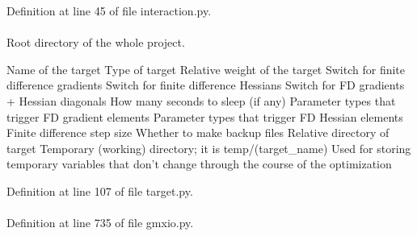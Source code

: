\-Definition at line 45 of file interaction.\-py.

\hypertarget{classforcebalance_1_1target_1_1Target_aede2856573b890cd47054ad36937d6f6}{
\paragraph[{tempdir}]{}}\label{classforcebalance_1_1target_1_1Target_aede2856573b890cd47054ad36937d6f6}


\-Root directory of the whole project. 

\-Name of the target \-Type of target \-Relative weight of the target \-Switch for finite difference gradients \-Switch for finite difference \-Hessians \-Switch for \-F\-D gradients + \-Hessian diagonals \-How many seconds to sleep (if any) \-Parameter types that trigger \-F\-D gradient elements \-Parameter types that trigger \-F\-D \-Hessian elements \-Finite difference step size \-Whether to make backup files \-Relative directory of target \-Temporary (working) directory; it is temp/(target\-\_\-name) \-Used for storing temporary variables that don't change through the course of the optimization 

\-Definition at line 107 of file target.\-py.

\hypertarget{classforcebalance_1_1gmxio_1_1Interaction__GMX_ae2f25a6d52978bd2551f729bce34b45e}{
\paragraph[{topfnm}]{}}\label{classforcebalance_1_1gmxio_1_1Interaction__GMX_ae2f25a6d52978bd2551f729bce34b45e}


\-Definition at line 735 of file gmxio.\-py.

